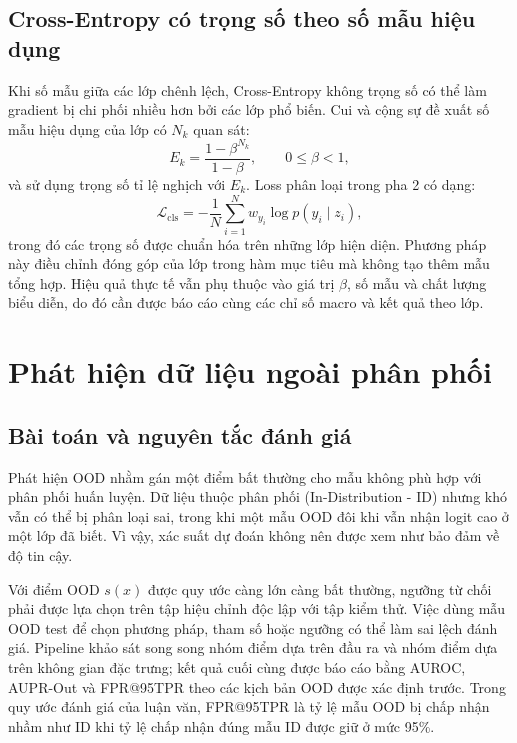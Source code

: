 \subsection{Cross-Entropy có trọng số theo số mẫu hiệu dụng}

Khi số mẫu giữa các lớp chênh lệch, Cross-Entropy không trọng số có thể làm gradient bị chi phối nhiều hơn bởi các lớp phổ biến. Cui và cộng sự \cite{Cui2019ClassBalanced} đề xuất số mẫu hiệu dụng của lớp có $N_k$ quan sát:
\begin{equation}
    E_k = \frac{1-\beta^{N_k}}{1-\beta}, \qquad 0 \leq \beta < 1,
\end{equation}
và sử dụng trọng số tỉ lệ nghịch với $E_k$. Loss phân loại trong pha 2 có dạng:
\begin{equation}
    \mathcal{L}_{\mathrm{cls}}
    = -\frac{1}{N}\sum_{i=1}^{N}w_{y_i}
      \log p(y_i\mid z_i),
\end{equation}
trong đó các trọng số được chuẩn hóa trên những lớp hiện diện. Phương pháp này điều chỉnh đóng góp của lớp trong hàm mục tiêu mà không tạo thêm mẫu tổng hợp. Hiệu quả thực tế vẫn phụ thuộc vào giá trị $\beta$, số mẫu và chất lượng biểu diễn, do đó cần được báo cáo cùng các chỉ số macro và kết quả theo lớp.

\section{Phát hiện dữ liệu ngoài phân phối}

\subsection{Bài toán và nguyên tắc đánh giá}

Phát hiện OOD nhằm gán một điểm bất thường cho mẫu không phù hợp với phân phối huấn luyện. Dữ liệu thuộc phân phối (In-Distribution - ID) nhưng khó vẫn có thể bị phân loại sai, trong khi một mẫu OOD đôi khi vẫn nhận logit cao ở một lớp đã biết. Vì vậy, xác suất dự đoán không nên được xem như bảo đảm về độ tin cậy.

Với điểm OOD $s(x)$ được quy ước càng lớn càng bất thường, ngưỡng từ chối phải được lựa chọn trên tập hiệu chỉnh độc lập với tập kiểm thử. Việc dùng mẫu OOD test để chọn phương pháp, tham số hoặc ngưỡng có thể làm sai lệch đánh giá. Pipeline khảo sát song song nhóm điểm dựa trên đầu ra và nhóm điểm dựa trên không gian đặc trưng; kết quả cuối cùng được báo cáo bằng AUROC, AUPR-Out và FPR@95TPR theo các kịch bản OOD được xác định trước. Trong quy ước đánh giá của luận văn, FPR@95TPR là tỷ lệ mẫu OOD bị chấp nhận nhầm như ID khi tỷ lệ chấp nhận đúng mẫu ID được giữ ở mức 95\%.

